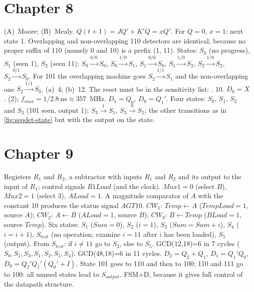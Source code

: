 \section*{Chapter 8}
 (A)~Moore; (B)~Mealy.
 $Q(t+1)=JQ'+K'Q=xQ'$. For $Q=0$, $x=1$: next state 1.
 Overlapping and non-overlapping 110 detectors are identical, because no proper suffix of $110$ (namely 0 and 10) is a prefix (1, 11). States: $S_0$ (no progress), $S_1$ (seen 1), $S_2$ (seen 11); $S_0\xrightarrow{0/0}S_0$, $S_0\xrightarrow{1/0}S_1$, $S_1\xrightarrow{0/0}S_0$, $S_1\xrightarrow{1/0}S_2$, $S_2\xrightarrow{1/0}S_2$, $S_2\xrightarrow{0/1}S_0$. For 101 the overlapping machine goes $S_2\xrightarrow{1/1}S_1$ and the non-overlapping one $S_2\xrightarrow{1/1}S_0$.
 (a)~4; (b)~12.
 The reset must be in the sensitivity list: .
 10. \quad {} $D_0=X$. \quad {} (2); $f_{max}=1/2.8\ \mathrm{ns}\approx357$~MHz.
 $D_1=Q_0$, $D_0=Q_1'$.
 Four states: $S_0$, $S_1$, $S_2$ and $S_3$ (101 seen, output 1); $S_3\xrightarrow{1}S_1$, $S_3\xrightarrow{0}S_2$; the other transitions as in \cref{fig:seqdet-state} but with the output on the state.

\section*{Chapter 9}
 Registers $R_1$ and $R_2$, a subtractor with inputs $R_1$ and $R_2$ and its output to the input of $R_1$; control signals $R1Load$ (and the clock).
 $Mux1=0$ (select $B$), $Mux2=1$ (select 3), $ALoad=1$.
 A magnitude comparator of $A$ with the constant 10 produces the status signal $AGT10$.
 $CW_1$: $Temp\leftarrow A$ ($TempLoad=1$, source $A$); $CW_2$: $A\leftarrow B$ ($ALoad=1$, source $B$); $CW_3$: $B\leftarrow Temp$ ($BLoad=1$, source $Temp$).
 Six states: $S_1$ ($Sum=0$), $S_2$ ($i=1$), $S_3$ ($Sum=Sum+i$), $S_4$ ($i=i+1$), $S_{test}$ (no operation; examine $i=11$ after $i$ has been loaded), $S_5$ (output). From $S_{test}$: if $i\ne11$ go to $S_3$, else to $S_5$.
 GCD(12,18)=6 in 7 cycles ($S_0,S_1,S_3,S_1,S_2,S_1,S_4$). GCD(48,18)=6 in 11 cycles.
 $D_2=Q_2+Q_1$, $D_1=Q_1'Q_0$, $D_0=Q_2'Q_1'(Q_0'+I)$. State 101 goes to 110 and then to 100; 110 and 111 go to 100: all unused states lead to $S_{output}$.
 FSM+D, because it gives full control of the datapath structure.

